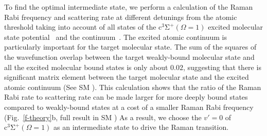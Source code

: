 \documentclass[aps,prl,twocolumn,10pt,superscriptaddress]{revtex4-1}
\newcommand{\todo}[1]{}
\begin{document}
To find the optimal intermediate state, we perform a calculation of the Raman Rabi frequency
and scattering rate at different detunings from the atomic threshold
taking into account of all states of
the $\mathrm{c^3\Sigma^+}(\Omega = 1)$ excited molecular state potential~\cite{Grochola2011}
and the continuum~\cite{Liu2017}.
The excited atomic continuum is particularly important for the target molecular state.
The sum of the squares of the wavefunction overlap
between the target weakly-bound molecular state
and all the excited molecular bound states is only about $0.02$,
suggesting that there is significant matrix element
between the target molecular state and the excited atomic continuum (See SM \todo{proper cite}).
This calculation shows that the ratio of the Raman Rabi rate to scattering rate
can be made larger for more deeply bound states compared to weakly-bound states
at a cost of a smaller Raman Rabi frequency
(Fig.~\ref{f-theory}b, full result in SM \todo{proper cite})
As a result, we choose the $v'=0$ of $\mathrm{c^3\Sigma^+}(\Omega = 1)$ as an intermediate state
to drive the Raman transition.
\end{document}
